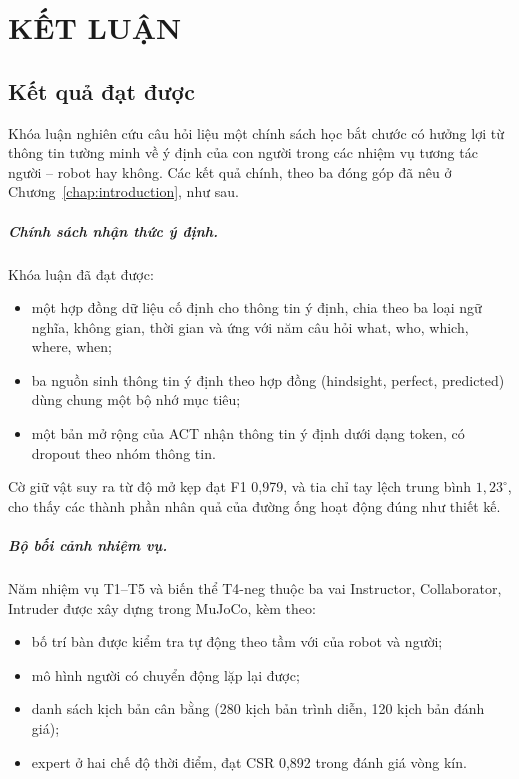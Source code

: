 \chapter{KẾT LUẬN}
\label{chap:conclusions}

\section{Kết quả đạt được}

Khóa luận nghiên cứu câu hỏi liệu một chính sách học bắt chước có hưởng lợi từ thông tin tường minh về ý định của con người trong các nhiệm vụ tương tác người -- robot hay không. Các kết quả chính, theo ba đóng góp đã nêu ở Chương~\ref{chap:introduction}, như sau.

\paragraph{Chính sách nhận thức ý định.} Khóa luận đã đạt được:
\begin{itemize}
  \item một hợp đồng dữ liệu cố định cho thông tin ý định, chia theo ba loại ngữ nghĩa, không gian, thời gian và ứng với năm câu hỏi what, who, which, where, when;
  \item ba nguồn sinh thông tin ý định theo hợp đồng (hindsight, perfect, predicted) dùng chung một bộ nhớ mục tiêu;
  \item một bản mở rộng của ACT nhận thông tin ý định dưới dạng token, có dropout theo nhóm thông tin.
\end{itemize}
Cờ giữ vật suy ra từ độ mở kẹp đạt F1 0,979, và tia chỉ tay lệch trung bình $1{,}23^\circ$, cho thấy các thành phần nhân quả của đường ống hoạt động đúng như thiết kế.

\paragraph{Bộ bối cảnh nhiệm vụ.} Năm nhiệm vụ T1--T5 và biến thể T4-neg thuộc ba vai Instructor, Collaborator, Intruder được xây dựng trong MuJoCo, kèm theo:
\begin{itemize}
  \item bố trí bàn được kiểm tra tự động theo tầm với của robot và người;
  \item mô hình người có chuyển động lặp lại được;
  \item danh sách kịch bản cân bằng (280 kịch bản trình diễn, 120 kịch bản đánh giá);
  \item expert ở hai chế độ thời điểm, đạt CSR 0,892 trong đánh giá vòng kín.
\end{itemize}

